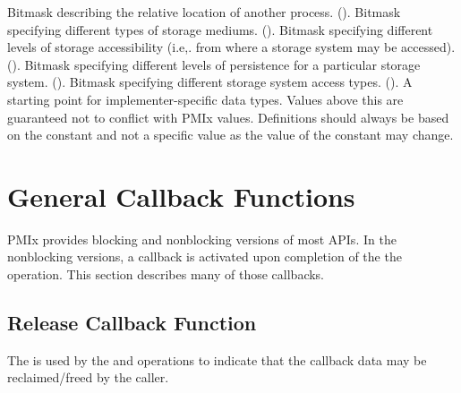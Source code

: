 \begin{constantdesc}
%
Bitmask describing the relative location of another process. ().
%
Bitmask specifying different types of storage mediums. ().
%
Bitmask specifying different levels of storage accessibility (i.e,. from where a storage system may be accessed). ().
%
Bitmask specifying different levels of persistence for a particular storage system. ().
%
Bitmask specifying different storage system access types. ().
%
A starting point for implementer-specific data types.
Values above this are guaranteed not to conflict with \ac{PMIx} values.
Definitions should always be based on the  constant and not a specific value as the value of the constant may change.
%
\end{constantdesc}


\section{General Callback Functions}

PMIx provides blocking and nonblocking versions of most APIs.
In the nonblocking versions, a callback is activated upon completion of the the operation.
This section describes many of those callbacks.

\subsection{Release Callback Function}

\summary

The  is used by the  and  operations to indicate that the callback data may be reclaimed/freed by the caller.

\format


